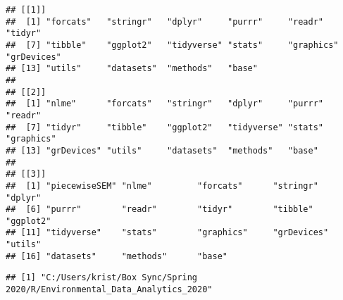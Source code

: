 \documentclass[
]{article}
\newenvironment{Shaded}{\begin{snugshade}}{\end{snugshade}}
\newcommand{\CommentTok}[1]{\textcolor[rgb]{0.56,0.35,0.01}{\textit{#1}}}
\newcommand{\ControlFlowTok}[1]{\textcolor[rgb]{0.13,0.29,0.53}{\textbf{#1}}}
\newcommand{\DataTypeTok}[1]{\textcolor[rgb]{0.13,0.29,0.53}{#1}}
\newcommand{\DecValTok}[1]{\textcolor[rgb]{0.00,0.00,0.81}{#1}}
\newcommand{\KeywordTok}[1]{\textcolor[rgb]{0.13,0.29,0.53}{\textbf{#1}}}
\newcommand{\NormalTok}[1]{#1}
\newcommand{\OperatorTok}[1]{\textcolor[rgb]{0.81,0.36,0.00}{\textbf{#1}}}
\newcommand{\OtherTok}[1]{\textcolor[rgb]{0.56,0.35,0.01}{#1}}
\newcommand{\StringTok}[1]{\textcolor[rgb]{0.31,0.60,0.02}{#1}}
\begin{document}
\begin{Shaded}
\end{Shaded}

\begin{verbatim}
## [[1]]
##  [1] "forcats"   "stringr"   "dplyr"     "purrr"     "readr"     "tidyr"    
##  [7] "tibble"    "ggplot2"   "tidyverse" "stats"     "graphics"  "grDevices"
## [13] "utils"     "datasets"  "methods"   "base"     
## 
## [[2]]
##  [1] "nlme"      "forcats"   "stringr"   "dplyr"     "purrr"     "readr"    
##  [7] "tidyr"     "tibble"    "ggplot2"   "tidyverse" "stats"     "graphics" 
## [13] "grDevices" "utils"     "datasets"  "methods"   "base"     
## 
## [[3]]
##  [1] "piecewiseSEM" "nlme"         "forcats"      "stringr"      "dplyr"       
##  [6] "purrr"        "readr"        "tidyr"        "tibble"       "ggplot2"     
## [11] "tidyverse"    "stats"        "graphics"     "grDevices"    "utils"       
## [16] "datasets"     "methods"      "base"
\end{verbatim}

\begin{Shaded}
\end{Shaded}

\begin{verbatim}
## [1] "C:/Users/krist/Box Sync/Spring 2020/R/Environmental_Data_Analytics_2020"
\end{verbatim}
\end{document}
